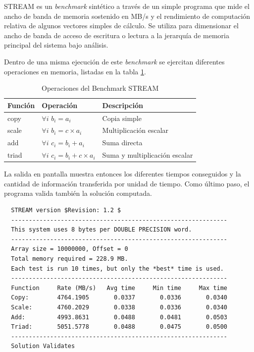 \documentclass[a4paper]{report}
\begin{document}
STREAM \cite{stream} es un {\it benchmark} sintético a través de un simple
programa que mide el ancho de banda de memoria sostenido en MB/s y el
rendimiento de computación relativa de algunos vectores simples de cálculo.
Se utiliza para dimensionar el ancho de banda de acceso de escritura o lectura
a la jerarquía de memoria principal del sistema bajo análisis.

\bigskip

Dentro de una misma ejecución de este {\it benchmark} se ejercitan diferentes
operaciones en memoria, listadas en la tabla \ref{table:stream}.

\begin{table}[H]
\caption{Operaciones del Benchmark STREAM}
  \begin{center}
    \begin{tabular}{|l|l|l|}\hline
      {\bf Función} & {\bf Operación} & {\bf Descripción} \\ \hline
      copy & $ \forall i $ $ b_{i} = a_{i} $ & Copia simple \\ \hline
      scale & $ \forall i $ $ b_{i} = c \times a_{i} $ & Multiplicación escalar \\ \hline
      add & $ \forall i $ $ c_{i} = b_{i} + a_{i} $ & Suma directa \\ \hline
      triad & $ \forall i $ $ c_{i} = b_{i} + c \times a_{i} $ & Suma y multiplicación escalar \\ \hline
    \end{tabular} 
   \end{center}
 \label{table:stream}
\end{table}

La salida en pantalla muestra entonces los diferentes tiempos conseguidos y la cantidad de información transferida por unidad de tiempo.
Como último paso, el programa valida también la solución computada.

{\small
\begin{verbatim}
  STREAM version $Revision: 1.2 $
  -------------------------------------------------------------
  This system uses 8 bytes per DOUBLE PRECISION word.
  -------------------------------------------------------------
  Array size = 10000000, Offset = 0
  Total memory required = 228.9 MB.
  Each test is run 10 times, but only the *best* time is used.
  -------------------------------------------------------------
  Function     Rate (MB/s)   Avg time     Min time     Max time
  Copy:        4764.1905       0.0337       0.0336       0.0340
  Scale:       4760.2029       0.0338       0.0336       0.0340
  Add:         4993.8631       0.0488       0.0481       0.0503
  Triad:       5051.5778       0.0488       0.0475       0.0500
  -------------------------------------------------------------
  Solution Validates
\end{verbatim}
}
\end{document}
